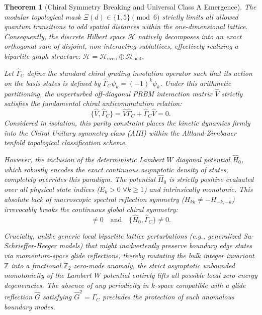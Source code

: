 \documentclass[aps,prl,preprint,superscriptaddress,floatfix]{revtex4-2}
\newtheorem{theorem}{Theorem}[section]
\newcommand{\Hilb}{\mathcal{H}}
\begin{document}
\begin{theorem}[Chiral Symmetry Breaking and Universal Class A Emergence]
\label{thm:chiral_breaking}
The modular topological mask $\Xi(d) \in \{1,5\} \pmod 6$ strictly limits all allowed quantum transitions to \emph{odd} spatial distances within the one-dimensional lattice. Consequently, the discrete Hilbert space $\Hilb$ natively decomposes into an exact orthogonal sum of disjoint, non-interacting sublattices, effectively realizing a bipartite graph structure: $\Hilb = \Hilb_{\text{even}} \oplus \Hilb_{\text{odd}}$.

Let $\hat{\Gamma}_C$ define the standard chiral grading involution operator such that its action on the basis states is defined by $\hat{\Gamma}_C \psi_k = (-1)^k \psi_k$. Under this arithmetic partitioning, the unperturbed off-diagonal PRBM interaction matrix $\hat{V}$ strictly satisfies the fundamental chiral anticommutation relation:
\begin{equation}
    \{ \hat{V}, \hat{\Gamma}_C \} = \hat{V}\hat{\Gamma}_C + \hat{\Gamma}_C\hat{V} = 0.
\end{equation}
Considered in isolation, this parity constraint places the kinetic dynamics firmly into the Chiral Unitary symmetry class (AIII) within the Altland-Zirnbauer tenfold topological classification scheme.

However, the inclusion of the deterministic Lambert $W$ diagonal potential $\hat{H}_0$, which robustly encodes the exact continuous asymptotic density of states, completely overrides this paradigm. The potential $\hat{H}_0$ is strictly positive evaluated over all physical state indices ($E_k > 0 \;\forall k \ge 1$) and intrinsically monotonic. This absolute lack of macroscopic spectral reflection symmetry ($H_{kk} \neq -H_{-k,-k}$) irrevocably breaks the continuous global chiral symmetry:
\begin{equation}
    [\hat{H}_0, \hat{\Gamma}_C] \neq 0 \quad \text{and} \quad \{ \hat{H}_0, \hat{\Gamma}_C \} \neq 0.
\end{equation}

Crucially, unlike generic local bipartite lattice perturbations (e.g., generalized Su-Schrieffer-Heeger models) that might inadvertently preserve boundary edge states via momentum-space glide reflections, thereby mutating the bulk integer invariant $\mathbb{Z}$ into a fractional $\mathbb{Z}_2$ zero-mode anomaly, the strict asymptotic unbounded monotonicity of the Lambert $W$ potential entirely lifts all possible local zero-energy degeneracies. The absence of any periodicity in $k$-space compatible with a glide reflection $\hat{G}$ satisfying $\hat{G}^2 = \hat{\Gamma}_C$ precludes the protection of such anomalous boundary modes.


\end{theorem}
\end{document}
